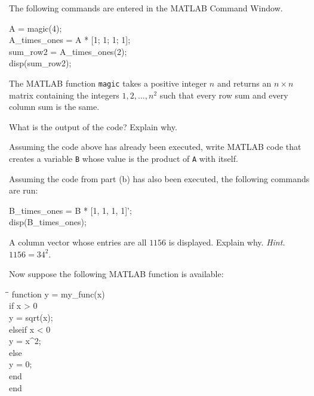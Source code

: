 \begin{problem}
The following commands are entered in the MATLAB Command Window.

{\small\ttfamily
\begin{tabbing}
A = magic(4);\\
A\_times\_ones = A * [1; 1; 1; 1];\\
sum\_row2 = A\_times\_ones(2);\\
disp(sum\_row2);
\end{tabbing}
}

The MATLAB function \texttt{magic} takes a positive integer $n$ and returns an $n\times n$ matrix containing the integers $1,2,\dots,n^2$ such that every row sum and every column sum is the same.

\begin{problemsubparts}
\item What is the output of the code? Explain why.
\item Assuming the code above has already been executed, write MATLAB code that creates a variable \texttt{B} whose value is the product of \texttt{A} with itself.
\item Assuming the code from part \textup{(b)} has also been executed, the following commands are run:

{\small\ttfamily
\begin{tabbing}
B\_times\_ones = B * [1, 1, 1, 1]';\\
disp(B\_times\_ones);
\end{tabbing}
}

A column vector whose entries are all $1156$ is displayed. Explain why. \textit{Hint.} $1156=34^2$.
\end{problemsubparts}

Now suppose the following MATLAB function is available:

{\small\ttfamily
\begin{tabbing}
\hspace{2em}\=\hspace{2em}\=\kill
function y = my\_func(x)\\
\>if x > 0\\
\>\>y = sqrt(x);\\
\>elseif x < 0\\
\>\>y = x\string^2;\\
\>else\\
\>\>y = 0;\\
\>end\\
end
\end{tabbing}
}


\end{problem}

